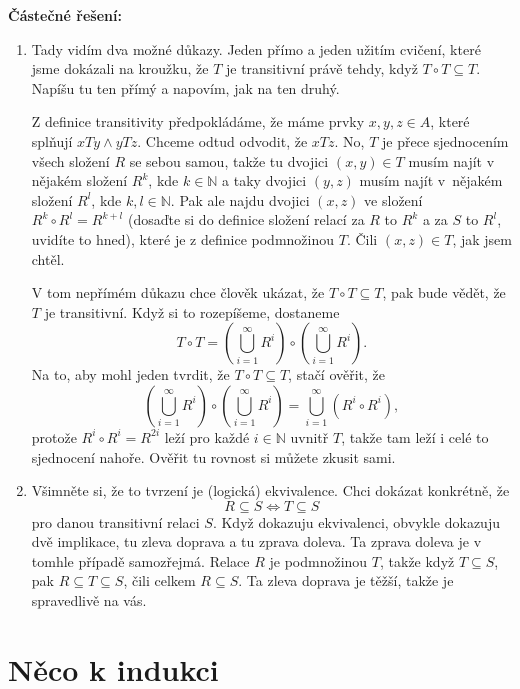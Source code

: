 \documentclass[a4paper,11pt]{article}
\newcommand{\N}{\mathbb{N}}
\begin{document}
\textbf{Částečné řešení:}
\begin{enumerate}
 \item Tady vidím dva možné důkazy. Jeden přímo a jeden užitím cvičení, které
  jsme dokázali na kroužku, že $T$ je transitivní právě tehdy, když $T \circ
  T \subseteq T$. Napíšu tu ten přímý a napovím, jak na ten druhý.

  Z definice transitivity předpokládáme, že máme prvky $x,y,z \in A$, které
  splňují $xTy \wedge yTz$. Chceme odtud odvodit, že $xTz$. No, $T$ je přece
  sjednocením všech složení $R$ se sebou samou, takže tu dvojici $(x,y) \in T$
  musím najít v nějakém složení $R^{k}$, kde $k \in \N$ a taky dvojici $(y,z)$
  musím najít v~nějakém složení $R^{l}$, kde $k,l \in \N$. Pak ale najdu dvojici
  $(x,z)$ ve složení $R^{k} \circ R^{l} = R^{k+l}$ (dosaďte si do definice
  složení relací za $R$ to $R^{k}$ a za $S$ to $R^{l}$, uvidíte to hned), které
  je z definice podmnožinou $T$. Čili $(x,z) \in T$, jak jsem chtěl.

  V tom nepřímém důkazu chce člověk ukázat, že $T \circ T \subseteq T$, pak bude
  vědět, že $T$ je transitivní. Když si to rozepíšeme, dostaneme
  \[
   T \circ T = \left( \bigcup_{i=1}^{\infty} R^{i} \right) \circ
   \left(\bigcup_{i=1}^{\infty} R^{i} \right). 
  \]
  Na to, aby mohl jeden tvrdit, že $T \circ T \subseteq T$, stačí ověřit, že
  \[
   \left( \bigcup_{i=1}^{\infty} R^{i} \right) \circ \left(
   \bigcup_{i=1}^{\infty} R^{i} \right) = \bigcup_{i=1}^{\infty} (R^{i} \circ
   R^{i}), 
  \]
  protože $R^{i} \circ R^{i} = R^{2i}$ leží pro každé $i  \in \N$ uvnitř $T$,
  takže tam leží i celé to sjednocení nahoře. Ověřit tu rovnost si můžete zkusit
  sami.

 \item Všimněte si, že to tvrzení je (logická) ekvivalence. Chci dokázat
  konkrétně, že
  \[
   R \subseteq S \Leftrightarrow T \subseteq S
  \]
  pro danou transitivní relaci $S$. Když dokazuju ekvivalenci, obvykle dokazuju
  dvě implikace, tu zleva doprava a tu zprava doleva. Ta zprava doleva je v
  tomhle případě samozřejmá. Relace $R$ je podmnožinou $T$, takže když $T
  \subseteq S$, pak $R \subseteq T \subseteq S$, čili celkem $R \subseteq S$. Ta
  zleva doprava je těžší, takže je spravedlivě na vás.
\end{enumerate}

\section*{Něco k indukci}
\end{document}
